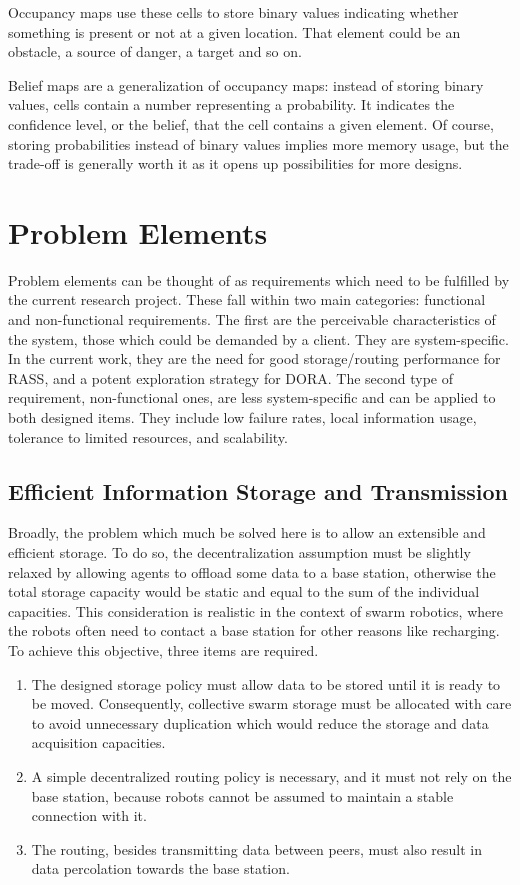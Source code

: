 Occupancy maps use these cells to store binary values indicating whether something is present or not at a given location. That element could be an obstacle, a source of danger, a target and so on.

Belief maps are a generalization of occupancy maps: instead of storing binary values, cells contain a number representing a probability. It indicates the confidence level, or the belief, that the cell contains a given element. Of course, storing probabilities instead of binary values implies more memory usage, but the trade-off is generally worth it as it opens up possibilities for more designs. 

\clearpage

\section{Problem Elements}  %

Problem elements can be thought of as requirements which need to be fulfilled by the current research project. These fall within two main categories: functional and non-functional requirements. The first are the perceivable characteristics of the system, those which could be demanded by a client. They are system-specific. In the current work, they are the need for good storage/routing performance for \ac{RASS}, and a potent exploration strategy for \ac{DORA}. The second type of requirement, non-functional ones, are less system-specific and can be applied to both designed items. They include low failure rates, local information usage, tolerance to limited resources, and scalability.  

\subsection{Efficient Information Storage and Transmission}
Broadly, the problem which much be solved here is to allow an extensible and efficient storage. To do so, the decentralization assumption must be slightly relaxed by allowing agents to offload some data to a base station, otherwise the total storage capacity would be static and equal to the sum of the individual capacities. This consideration is realistic in the context of swarm robotics, where the robots often need to contact a base station for other reasons like recharging. To achieve this objective, three items are required.

\begin{enumerate}
    \item The designed storage policy must allow data to be stored until it is ready to be moved. Consequently, collective swarm storage must be allocated with care to avoid unnecessary duplication which would reduce the storage and data acquisition capacities.
    \item A simple decentralized routing policy is necessary, and it must not rely on the base station, because robots cannot be assumed to maintain a stable connection with it.
    \item The routing, besides transmitting data between peers, must also result in data percolation towards the base station.
\end{enumerate}

